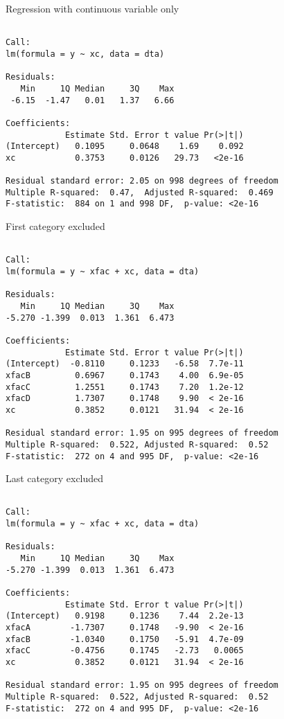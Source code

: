 \documentclass[10pt,ignorenonframetext,]{beamer}
\begin{document}
\begin{frame}[fragile]{Regression with continuous variable only}

\begin{verbatim}

Call:
lm(formula = y ~ xc, data = dta)

Residuals:
   Min     1Q Median     3Q    Max 
 -6.15  -1.47   0.01   1.37   6.66 

Coefficients:
            Estimate Std. Error t value Pr(>|t|)
(Intercept)   0.1095     0.0648    1.69    0.092
xc            0.3753     0.0126   29.73   <2e-16

Residual standard error: 2.05 on 998 degrees of freedom
Multiple R-squared:  0.47,  Adjusted R-squared:  0.469 
F-statistic:  884 on 1 and 998 DF,  p-value: <2e-16
\end{verbatim}

\end{frame}

\begin{frame}[fragile]{First category excluded}

\begin{verbatim}

Call:
lm(formula = y ~ xfac + xc, data = dta)

Residuals:
   Min     1Q Median     3Q    Max 
-5.270 -1.399  0.013  1.361  6.473 

Coefficients:
            Estimate Std. Error t value Pr(>|t|)
(Intercept)  -0.8110     0.1233   -6.58  7.7e-11
xfacB         0.6967     0.1743    4.00  6.9e-05
xfacC         1.2551     0.1743    7.20  1.2e-12
xfacD         1.7307     0.1748    9.90  < 2e-16
xc            0.3852     0.0121   31.94  < 2e-16

Residual standard error: 1.95 on 995 degrees of freedom
Multiple R-squared:  0.522, Adjusted R-squared:  0.52 
F-statistic:  272 on 4 and 995 DF,  p-value: <2e-16
\end{verbatim}

\end{frame}

\begin{frame}[fragile]{Last category excluded}

\begin{verbatim}

Call:
lm(formula = y ~ xfac + xc, data = dta)

Residuals:
   Min     1Q Median     3Q    Max 
-5.270 -1.399  0.013  1.361  6.473 

Coefficients:
            Estimate Std. Error t value Pr(>|t|)
(Intercept)   0.9198     0.1236    7.44  2.2e-13
xfacA        -1.7307     0.1748   -9.90  < 2e-16
xfacB        -1.0340     0.1750   -5.91  4.7e-09
xfacC        -0.4756     0.1745   -2.73   0.0065
xc            0.3852     0.0121   31.94  < 2e-16

Residual standard error: 1.95 on 995 degrees of freedom
Multiple R-squared:  0.522, Adjusted R-squared:  0.52 
F-statistic:  272 on 4 and 995 DF,  p-value: <2e-16
\end{verbatim}

\end{frame}
\end{document}
